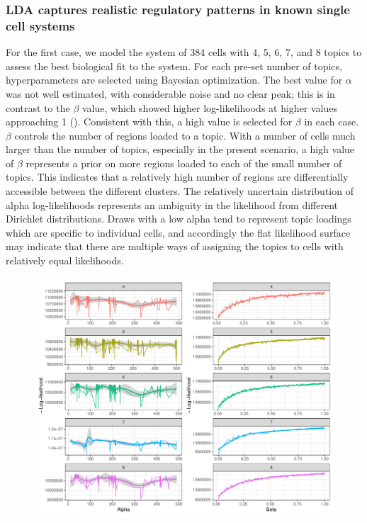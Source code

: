 \subsubsection{LDA captures realistic regulatory patterns in known single cell systems} \label{ch4:sc}

For the first case, we model the system of 384 cells with 4, 5, 6, 7, and 8 topics to assess the best biological fit to the system. For each pre-set number of topics, hyperparameters are selected using Bayesian optimization. The best value for $\alpha$ was not well estimated, with considerable noise and no clear peak; this is in contrast to the $\beta$ value, which showed higher log-likelihoods at higher values approaching 1 (). Consistent with this, a high value is selected for $\beta$ in each case. $\beta$ controls the number of regions loaded to a topic. With a number of cells much larger than the number of topics, especially in the present scenario, a high value of $\beta$ represents a prior on more regions loaded to each of the small number of topics. This indicates that a relatively high number of regions are differentially accessible between the different clusters. The relatively uncertain distribution of alpha log-likelihoods represents an ambiguity in the likelihood from different Dirichlet distributions. Draws with a low alpha tend to represent topic loadings which are specific to individual cells, and accordingly the flat likelihood surface may indicate that there are multiple ways of assigning the topics to cells with relatively equal likelihoods.

\begin{figure}
  \centering
  \includegraphics[width=\textwidth]{plot/ch4/sc_opt_params}
  \label{fig:sc_opt_params}
\end{figure}

